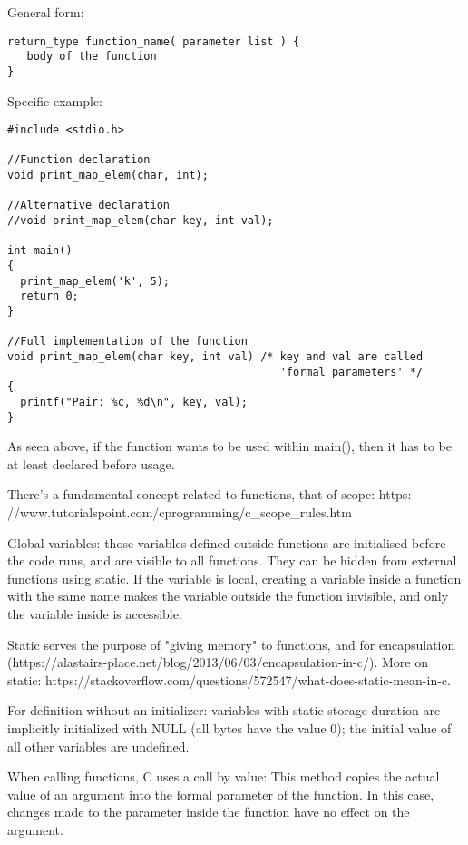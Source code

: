 \documentclass[11pt]{article}
\begin{document}
General form:

\begin{lstlisting}[numbers=none]
return_type function_name( parameter list ) {
   body of the function
}
\end{lstlisting}

Specific example:

\begin{lstlisting}
#include <stdio.h>

//Function declaration
void print_map_elem(char, int);

//Alternative declaration
//void print_map_elem(char key, int val);

int main()
{
  print_map_elem('k', 5);
  return 0;
}

//Full implementation of the function
void print_map_elem(char key, int val) /* key and val are called
                                          'formal parameters' */
{
  printf("Pair: %c, %d\n", key, val);
}
\end{lstlisting}

As seen above, if the function wants to be used within main(), then it has to be at least declared before usage.

There's a fundamental concept related to functions, that of scope: https: //www.tutorialspoint.com/cprogramming/c\_scope\_rules.htm

Global variables: those variables defined outside functions are initialised before the code runs, and are visible to all functions. They can be hidden from external functions using static. If the variable is local, creating a variable inside a function with the same name makes the variable outside the function invisible, and only the variable inside is accessible.

Static serves the purpose of "giving memory" to functions, and for encapsulation (https://alastairs-place.net/blog/2013/06/03/encapsulation-in-c/). More on static: https://stackoverflow.com/questions/572547/what-does-static-mean-in-c.

For definition without an initializer: variables with static storage duration are implicitly initialized with NULL (all bytes have the value 0); the initial value of all other variables are undefined.

When calling functions, C uses a call by value: This method copies the actual value of an argument into the formal parameter of the function. In this case, changes made to the parameter inside the function have no effect on the argument.
\end{document}
